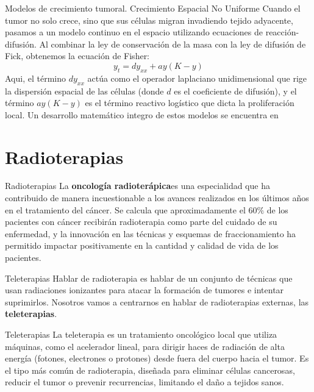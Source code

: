 \documentclass{beamer}
\begin{document}
\begin{frame}{Modelos de crecimiento tumoral. Crecimiento Espacial No Uniforme}
Cuando el tumor no solo crece, sino que sus células migran invadiendo tejido adyacente, pasamos a un modelo continuo en el espacio utilizando ecuaciones de reacción-difusión. Al combinar la ley de conservación de la masa con la ley de difusión de Fick, obtenemos la ecuación de Fisher:
\begin{equation}
    y_t=dy_{xx}+ay(K-y)
\end{equation}
Aqui, el término $dy_{xx}$ actúa como el operador laplaciano unidimensional que rige la dispersión espacial de las células (donde $d$ es el coeficiente de difusión), y el término $ay(K-y)$ es el término reactivo logístico que dicta la proliferación local.
Un desarrollo matemático integro de estos modelos se encuentra en \cite{garcia2021}
\end{frame}


\section{Radioterapias}
\begin{frame}{Radioterapias}
La \textbf{oncología radioterápica}es una especialidad que ha contribuido de manera incuestionable a los avances realizados en los últimos años en el tratamiento del cáncer. Se
calcula que aproximadamente el $60\%$ de los pacientes con cáncer recibirán radioterapia
como parte del cuidado de su enfermedad, y la innovación en las técnicas y esquemas
de fraccionamiento ha permitido impactar positivamente en la cantidad y calidad de
vida de los pacientes. 
\end{frame}

\begin{frame}{Teleterapias}
Hablar de radioterapia es hablar de un conjunto de técnicas que usan radiaciones ionizantes para atacar la formación de tumores e intentar suprimirlos. Nosotros vamos a centrarnos en hablar de radioterapias externas, las \textbf{teleterapias}.

\begin{block}{Teleterapias}
La teleterapia es un tratamiento oncológico local que utiliza máquinas, como el acelerador lineal, para dirigir haces de radiación de alta energía (fotones, electrones o protones) desde fuera del cuerpo hacia el tumor. Es el tipo más común de radioterapia, diseñada para eliminar células cancerosas, reducir el tumor o prevenir recurrencias, limitando el daño a tejidos sanos.
\end{block}    
\end{frame}
\end{document}
